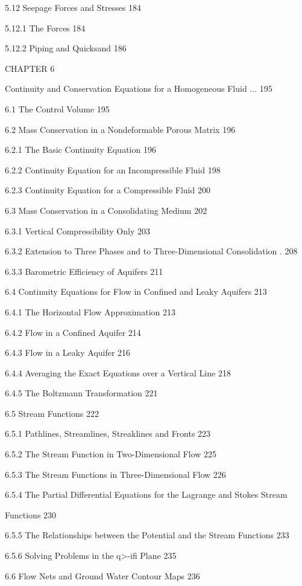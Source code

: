 \documentclass[
  11pt,
]{article}
\begin{document}
5.12 Seepage Forces and Stresses 184 \par
5.12.1 The Forces 184 \par
5.12.2 Piping and Quicksand 186 \par
CHAPTER 6 \par
Continuity and Conservation Equations for a Homogeneous Fluid ... 195 \par
6.1 The Control Volume 195 \par
6.2 Mass Conservation in a Nondeformable Porous Matrix 196 \par
6.2.1 The Basic Continuity Equation 196 \par
6.2.2 Continuity Equation for an Incompressible Fluid 198 \par
6.2.3 Continuity Equation for a Compressible Fluid 200 \par
6.3 Mass Conservation in a Consolidating Medium 202 \par
6.3.1 Vertical Compressibility Only 203 \par
6.3.2 Extension to Three Phases and to Three-Dimensional Consolidation . 208 \par
6.3.3 Barometric Efficiency of Aquifers 211 \par
6.4 Continuity Equations for Flow in Confined and Leaky Aquifers 213 \par
6.4.1 The Horizontal Flow Approximation 213 \par
6.4.2 Flow in a Confined Aquifer 214 \par
6.4.3 Flow in a Leaky Aquifer 216 \par
6.4.4 Averaging the Exact Equations over a Vertical Line 218 \par
6.4.5 The Boltzmann Transformation 221 \par
6.5 Stream Functions 222 \par
6.5.1 Pathlines, Streamlines, Streaklines and Fronts 223 \par
6.5.2 The Stream Function in Two-Dimensional Flow 225 \par
6.5.3 The Stream Functions in Three-Dimensional Flow 226 \par
6.5.4 The Partial Differential Equations for the Lagrange and Stokes Stream \par
Functions 230 \par
6.5.5 The Relationships between the Potential and the Stream Functions 233 \par
6.5.6 Solving Problems in the q\textgreater-ifi Plane 235 \par
6.6 Flow Nets and Ground Water Contour Maps 236 \par
\end{document}

